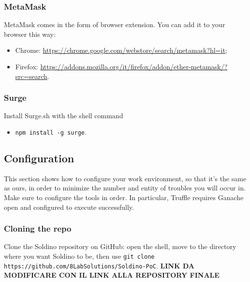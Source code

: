 \subsubsection{MetaMask}
MetaMask comes in the form of browser extension. You can add it to your browser this way:
\begin{itemize}
	\item Chrome:  \href{https://chrome.google.com/webstore/search/metamask?hl=it}{https://chrome.google.com/webstore/search/metamask?hl=it};
	\item Firefox: \href{https://addons.mozilla.org/it/firefox/addon/ether-metamask/?src=search}{https://addons.mozilla.org/it/firefox/addon/ether-metamask/?src=search}.
\end{itemize}


\subsubsection{Surge}
Install Surge.sh with the shell command
\begin{itemize}
	\item[]\texttt{npm install -g surge}.
\end{itemize}


\subsection{Configuration}
This section shows how to configure your work environment, so that it's the same as ours, in order to minimize the number and entity of troubles you will occur in.\\
Make sure to configure the tools in order. In particular, Truffle requires Ganache open and configured to execute successfully.
\subsubsection{Cloning the repo}
Clone the Soldino repository on GitHub: open the shell, move to the directory where you want Soldino to be, then use \texttt{git clone https://github.com/8LabSolutions/Soldino-PoC}. \textbf{LINK DA MODIFICARE CON IL LINK ALLA REPOSITORY FINALE}

